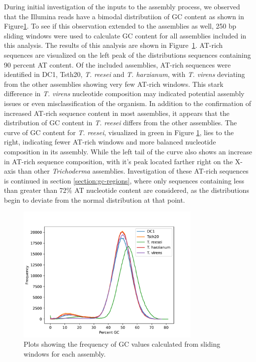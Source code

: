 During initial investigation of the inputs to the assembly process, we
observed that the Illumina reads have a bimodal distributiion of GC
content as shown in Figure\ref{fig:assembly-gc}. To see if this
observation extended to the assemblies as well, 250 bp sliding windows
were used to calculate GC content for all assemblies included in this
analysis. The results of this analysis are shown in
Figure~\ref{fig:assembly-gc}. AT-rich sequences are visualized on the
left peak of the distributions sequences containing 90 percent AT
content. Of the included assemblies, AT-rich sequences were identified
in DC1, Tsth20, \textit{T. reesei} and \textit{T. harzianum}, with
\textit{T. virens} deviating from the other assemblies showing very
few AT-rich windows. This stark difference in \textit{T. virens}
nucleotide composition may indicated potential assembly issues or even
misclassification of the organism. In addition to the confirmation of
increased AT-rich sequence content in most assemblies, it appears that
the distribution of GC content in \textit{T. reesei} differs from the
other assemblies. The curve of GC content for \textit{T. reesei},
visualized in green in Figure \ref{fig:assembly-gc}, lies to the
right, indicating fewer AT-rich windows and more balanced nucleotide
composition in its assembly. While the left tail of the curve also
shows an increase in AT-rich sequence composition, with it's peak
located farther right on the X-axis than other \textit{Trichoderma}
assemblies. Investigation of these AT-rich sequences is continued in
section \ref{section:gc-regions}, where only sequences containing less
than greater than 72\% AT nucleotide content are considered, as the
distributions begin to deviate from the normal distribution at that
point.

\begin{figure}
  \begin{center}
    \includegraphics[width=0.8\textwidth]{figures/gc-plot.pdf}
  \end{center}
  \caption{Plots showing the frequency of GC values calculated from
    sliding windows for each assembly.}
  \label{fig:assembly-gc}
\end{figure}


